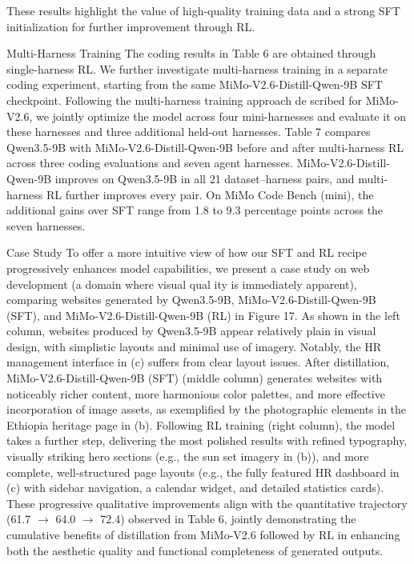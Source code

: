 \documentclass[
  10
]{article}
\begin{document}
These results highlight the value of high-quality training data and a
strong SFT initialization for further improvement through RL.

Multi-Harness Training The coding results in Table 6 are obtained
through single-harness RL. We further investigate multi-harness training
in a separate coding experiment, starting from the same
MiMo-V2.6-Distill-Qwen-9B SFT checkpoint. Following the multi-harness
training approach de scribed for MiMo-V2.6, we jointly optimize the
model across four mini-harnesses and evaluate it on these harnesses and
three additional held-out harnesses. Table 7 compares Qwen3.5-9B with
MiMo-V2.6-Distill-Qwen-9B before and after multi-harness RL across three
coding evaluations and seven agent harnesses. MiMo-V2.6-Distill-Qwen-9B
improves on Qwen3.5-9B in all 21 dataset--harness pairs, and
multi-harness RL further improves every pair. On MiMo Code Bench (mini),
the additional gains over SFT range from 1.8 to 9.3 percentage points
across the seven harnesses.

Case Study To offer a more intuitive view of how our SFT and RL recipe
progressively enhances model capabilities, we present a case study on
web development (a domain where visual qual ity is immediately
apparent), comparing websites generated by Qwen3.5-9B,
MiMo-V2.6-Distill-Qwen-9B (SFT), and MiMo-V2.6-Distill-Qwen-9B (RL) in
Figure 17. As shown in the left column, websites produced by Qwen3.5-9B
appear relatively plain in visual design, with simplistic layouts and
minimal use of imagery. Notably, the HR management interface in (c)
suffers from clear layout issues. After distillation,
MiMo-V2.6-Distill-Qwen-9B (SFT) (middle column) generates websites with
noticeably richer content, more harmonious color palettes, and more
effective incorporation of image assets, as exemplified by the
photographic elements in the Ethiopia heritage page in (b). Following RL
training (right column), the model takes a further step, delivering the
most polished results with refined typography, visually striking hero
sections (e.g., the sun set imagery in (b)), and more complete,
well-structured page layouts (e.g., the fully featured HR dashboard in
(c) with sidebar navigation, a calendar widget, and detailed statistics
cards). These progressive qualitative improvements align with the
quantitative trajectory (61.7 $\to$ 64.0 $\to$ 72.4) observed in Table 6,
jointly demonstrating the cumulative benefits of distillation from
MiMo-V2.6 followed by RL in enhancing both the aesthetic quality and
functional completeness of generated outputs.
\end{document}
